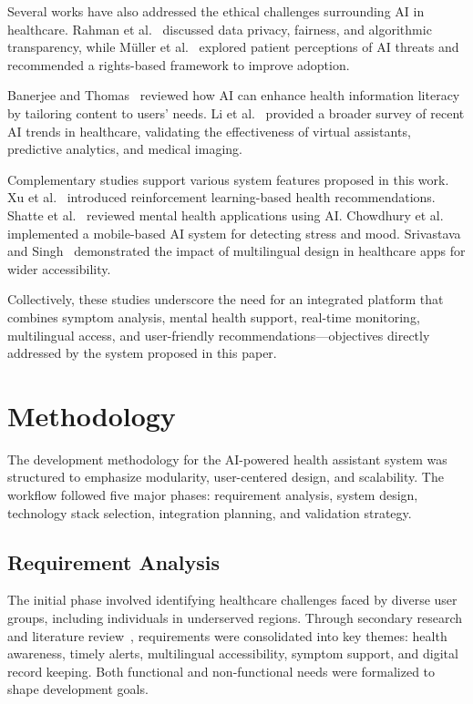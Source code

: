 \documentclass[conference]{IEEEtran}
\begin{document}
Several works have also addressed the ethical challenges surrounding AI in healthcare. Rahman et al.~\cite{rahman2023risk} discussed data privacy, fairness, and algorithmic transparency, while Müller et al.~\cite{muller2024threats} explored patient perceptions of AI threats and recommended a rights-based framework to improve adoption.

Banerjee and Thomas~\cite{banerjee2024literacy} reviewed how AI can enhance health information literacy by tailoring content to users’ needs. Li et al.~\cite{li2023advances} provided a broader survey of recent AI trends in healthcare, validating the effectiveness of virtual assistants, predictive analytics, and medical imaging.

Complementary studies support various system features proposed in this work. Xu et al.~\cite{xu2021recommendation} introduced reinforcement learning-based health recommendations. Shatte et al.~\cite{shatte2019machine} reviewed mental health applications using AI. Chowdhury et al.~\cite{chowdhury2021ai} implemented a mobile-based AI system for detecting stress and mood. Srivastava and Singh~\cite{srivastava2020multilingual} demonstrated the impact of multilingual design in healthcare apps for wider accessibility.

Collectively, these studies underscore the need for an integrated platform that combines symptom analysis, mental health support, real-time monitoring, multilingual access, and user-friendly recommendations—objectives directly addressed by the system proposed in this paper.

\section{Methodology}

The development methodology for the AI-powered health assistant system was structured to emphasize modularity, user-centered design, and scalability. The workflow followed five major phases: requirement analysis, system design, technology stack selection, integration planning, and validation strategy.

\subsection{Requirement Analysis}

The initial phase involved identifying healthcare challenges faced by diverse user groups, including individuals in underserved regions. Through secondary research and literature review~\cite{mahapatra2023remote, srivastava2020multilingual}, requirements were consolidated into key themes: health awareness, timely alerts, multilingual accessibility, symptom support, and digital record keeping. Both functional and non-functional needs were formalized to shape development goals.
\end{document}
